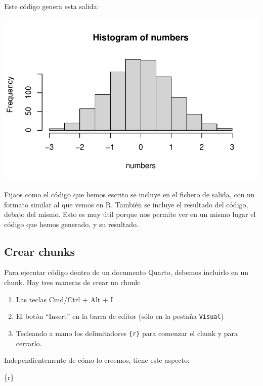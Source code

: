 \documentclass[
  letterpaper,
  DIV=11,
  numbers=noendperiod]{scrreprt}
\newenvironment{Shaded}{\begin{snugshade}}{\end{snugshade}}
\newcommand{\InformationTok}[1]{\textcolor[rgb]{0.37,0.37,0.37}{#1}}
\begin{document}
Este código genera esta salida:

\includegraphics{00_RMarkdown_Quarto_files/figure-pdf/unnamed-chunk-3-1.pdf}

Fijaos como el código que hemos escrito se incluye en el fichero de
salida, con un formato similar al que vemos en R. También se incluye el
resultado del código, debajo del mismo. Esto es muy útil porque nos
permite ver en un mismo lugar el código que hemos generado, y su
resultado.

\hypertarget{crear-chunks}{%
\subsection{Crear chunks}\label{crear-chunks}}

Para ejecutar código dentro de un documento Quarto, debemos incluirlo en
un chunk. Hay tres maneras de crear un chunk:

\begin{enumerate}
\def\labelenumi{\arabic{enumi}.}
\item
  Las teclas Cmd/Ctrl + Alt + I
\item
  El botón ``Insert'' en la barra de editor (sólo en la pestaña
  \texttt{Visual})
\item
  Tecleando a mano los delimitadores
  \texttt{\textasciigrave{}\textasciigrave{}\textasciigrave{}\{r\}} para
  comenzar el chunk y
  \texttt{\textasciigrave{}\textasciigrave{}\textasciigrave{}}para
  cerrarlo.
\end{enumerate}

Independientemente de cómo lo creemos, tiene este aspecto:

\begin{Shaded}
\begin{Highlighting}[]
\InformationTok{\textasciigrave{}\textasciigrave{}\textasciigrave{}\{r\}}
\InformationTok{\textasciigrave{}\textasciigrave{}\textasciigrave{}}
\end{Highlighting}
\end{Shaded}
\end{document}
